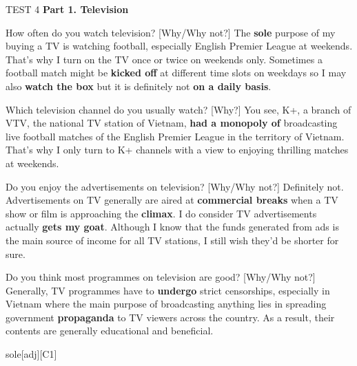 \begin{glossarymc}[Cambridge 8]
    \begin{test}{TEST 4}
    \noindent
    \textbf{Part 1. Television}
    \begin{qa}{How often do you watch television? [Why/Why not?]}
    The \textbf{sole} purpose of my buying a TV is watching football, especially English Premier League at weekends. That’s why I turn on the TV once or twice on weekends only. Sometimes a football match might be \textbf{kicked off} at different time slots on weekdays so I may also \textbf{watch the box} but it is definitely not \textbf{on a daily basis}.
    \end{qa}

    \begin{qa}{Which television channel do you usually watch? [Why?]}
    You see, K+, a branch of VTV, the national TV station of Vietnam, \textbf{had a monopoly of} broadcasting live football matches of the English Premier League in the territory of Vietnam. That’s why I only turn to K+ channels with a view to enjoying thrilling matches at weekends.
    \end{qa}

    \begin{qa}{Do you enjoy the advertisements on television? [Why/Why not?]}
    Definitely not. Advertisements on TV generally are aired at \textbf{commercial breaks} when a TV show or film is approaching the \textbf{climax}. I do consider TV advertisements actually \textbf{gets my goat}. Although I know that the funds generated from ads is the main source of income for all TV stations, I still wish they’d be shorter for sure.
    \end{qa}

    \begin{qa}{Do you think most programmes on television are good? [Why/Why not?]}
    Generally, TV programmes have to \textbf{undergo} strict censorships, especially in Vietnam where the main purpose of broadcasting anything lies in spreading government \textbf{propaganda} to TV viewers across the country. As a result, their contents are generally educational and beneficial.
    \end{qa}

        \begin{VocabExplain}[Part 1]
            \begin{ExplainCard}{sole}[adj][C1]
            \end{ExplainCard}


\end{VocabExplain}
\end{test}
\end{glossarymc}
